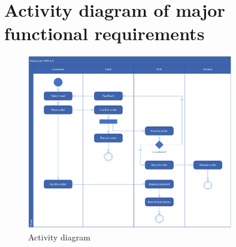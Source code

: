 \section{Activity diagram of major functional requirements}
\begin{figure}[H]
  \centering
  \includegraphics[width=0.8\textwidth]{./assets/t2/Activity_Diagram.png}
  \caption{Activity diagram}
\end{figure}

